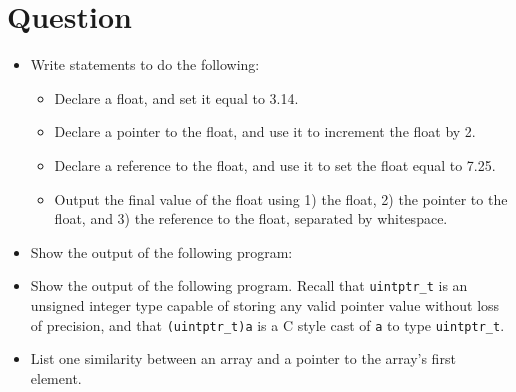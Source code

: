 
\newpage

\section{Question}

\begin{itemize}

  \item Write statements to do the following:
    \begin{itemize}
      \item Declare a float, and set it equal to 3.14.
      \item Declare a pointer to the float, and use it to increment the float
        by 2.
      \item Declare a reference to the float, and use it to set the float
        equal to 7.25.
      \item Output the final value of the float using 1) the float, 2) the
        pointer to the float, and 3) the reference to the float, separated by
        whitespace.
    \end{itemize}
    \vfill

  \item Show the output of the following program:

    \filbreak

  \item Show the output of the following program.  Recall that
    \texttt{uintptr_t} is an unsigned integer type capable of
    storing any valid pointer value without loss of precision, and that
    \texttt{(uintptr_t)a} is a C style cast of \texttt{a} to
    type \texttt{uintptr_t}.
    \vspace{3ex}

  \item List one similarity between an array and a pointer to the array's first
    element.
    \vfill


\end{itemize}

